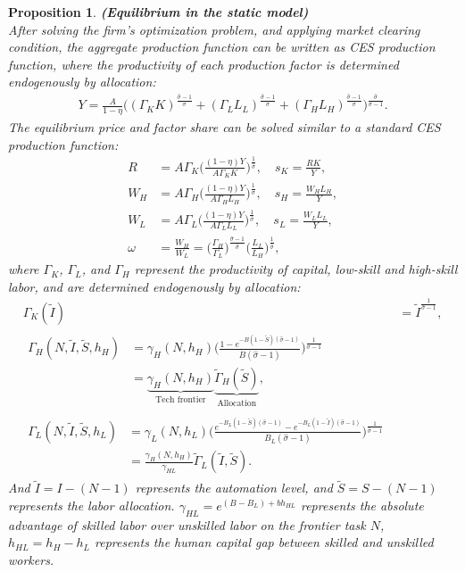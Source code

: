 \documentclass[12pt]{article}
\newtheorem{proposition}{Proposition}
\begin{document}
\begin{proposition}{\bf (Equilibrium in the static model)} \\

After solving the firm's optimization problem, and applying market clearing condition, the aggregate production function can be written as CES production function, where the productivity of each production factor is determined endogenously by allocation: 
\begin{align}
\label{output}
Y = \frac{A}{1-\eta}\Big((\Gamma_KK)^{\frac{\hat{\sigma}-1}{\hat{\sigma}}}+(\Gamma_LL_L)^{\frac{\hat{\sigma}-1}{\hat{\sigma}}}+(\Gamma_HL_H)^{\frac{\hat{\sigma}-1}{\hat{\sigma}}}\Big)^{\frac{\hat{\sigma}}{\hat{\sigma}-1}}.
\end{align}
The equilibrium price and factor share can be solved similar to a standard CES production function: 
\begin{align*}
R &=A\Gamma_K\Big(\frac{(1-\eta)Y}{A\Gamma_KK}\Big)^{\frac{1}{\hat{\sigma}}},   \quad s_K= \frac{RK}{Y},  \\
W_H &=A\Gamma_H\Big(\frac{(1-\eta)Y}{A\Gamma_HL_H}\Big)^{\frac{1}{\hat{\sigma}}},  \quad s_H = \frac{W_HL_H}{Y},  \\
W_L &= A\Gamma_L\Big(\frac{(1-\eta)Y}{A\Gamma_LL_L}\Big)^{\frac{1}{\hat{\sigma}}},  \quad s_L = \frac{W_LL_L}{Y},   \\
\omega &= \frac{W_H}{W_L} = \Big(\frac{\Gamma_H}{\Gamma_L} \Big)^{\frac{\hat{\sigma}-1}{\hat{\sigma}}}\Big(\frac{L_L}{L_H} \Big)^{\frac{1}{\hat{\sigma}}}, 
\end{align*}
where $\Gamma_K$, $\Gamma_L$, and $\Gamma_H$ represent the productivity of capital, low-skill and high-skill labor, and are determined endogenously by allocation: 
\begin{align}
\label{Gamma_K}
\Gamma_K(\tilde{I}) &= \tilde{I}^{\frac{1}{\hat{\sigma}-1}}, \\
\label{Gamma_H}
\begin{split}
\Gamma_H(N,\tilde{I},\tilde{S},h_H)  &= \gamma_H(N,h_H)\Big(\frac{1-e^{-B(1-\tilde{S})(\hat{\sigma}-1)}}{B(\hat{\sigma}-1)}\Big)^{\frac{1}{\hat{\sigma}-1}} \\
&= \underbrace{\gamma_H(N,h_H)}_{\text{Tech frontier}}\underbrace{\tilde{\Gamma}_H(\tilde{S})}_{\text{Allocation}},
\end{split}
\\
\label{Gamma_L}
\begin{split}
\Gamma_L(N,\tilde{I},\tilde{S},h_L)  &= \gamma_L(N,h_L)\Big(\frac{e^{-B_L(1-\tilde{S})(\hat{\sigma}-1)}-e^{-B_L(1-\tilde{I})(\hat{\sigma}-1)}}{B_L(\hat{\sigma}-1)}\Big)^{\frac{1}{\hat{\sigma}-1}}\\
 &=\frac{\gamma_H(N,h_H)}{\gamma_{HL}}\tilde{\Gamma}_L(\tilde{I},\tilde{S}).
 \end{split}
\end{align}
And $\tilde{I} = I-(N-1)$ represents the automation level, and $\tilde{S} = S-(N-1)$ represents the labor allocation. $\gamma_{HL} = e^{(B-B_L)+bh_{HL}}$ represents the absolute advantage of skilled labor over unskilled labor on the frontier task $N$, $h_{HL} = h_H-h_L$ represents the human capital gap between skilled and unskilled workers.  
\end{proposition}
\end{document}
